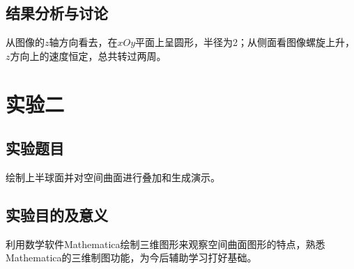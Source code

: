 \documentclass{ctexart}
\begin{document}
	\subsection{结果分析与讨论}
	从图像的$z$轴方向看去，在$xOy$平面上呈圆形，半径为2；从侧面看图像螺旋上升，$z$方向上的速度恒定，总共转过两周。
	
	
	
	
\section{实验二}
\subsection{实验题目}
绘制上半球面并对空间曲面进行叠加和生成演示。
\subsection{实验目的及意义}
利用数学软件Mathematica绘制三维图形来观察空间曲面图形的特点，熟悉Mathematica的三维制图功能，为今后辅助学习打好基础。
\end{document}
